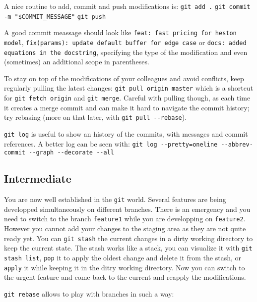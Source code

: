A nice routine to add, commit and push modifications is:\newline
\texttt{git add .}\newline
\texttt{git commit -m "\$COMMIT_MESSAGE"}\newline
\texttt{git push}

A good commit meassage should look like \texttt{feat: fast pricing for heston model}, \texttt{fix(params): update default buffer for edge case} or \texttt{docs: added equations in the docstring}, specifying the type of the modification and even (sometimes) an additional scope in parentheses.

To stay on top of the modifications of your colleagues and avoid conflicts, keep regularly pulling the latest changes:\newline
\texttt{git pull origin master}\newline
which is a shortcut for \texttt{git fetch origin} and \texttt{git merge}. Careful with pulling though, as each time it creates a merge commit and can make it hard to navigate the commit history; try rebasing (more on that later, with \texttt{git pull -{}-rebase}).

\texttt{git log} is useful to show an history of the commits, with messages and commit references. A better log can be seen with:\newline
\texttt{git log -{}-pretty=oneline -{}-abbrev-commit -{}-graph -{}-decorate -{}-all}

\subsection*{Intermediate}

You are now well established in the \texttt{git} world. Several features are being developped simultaneously on different branches. There is an emergency and you need to switch to the branch \texttt{feature1} while you are developping on \texttt{feature2}. However you cannot add your changes to the staging area as they are not quite ready yet. You can \texttt{git stash} the current changes in a dirty working directory to keep the current state. The stash works like a stack, you can visualize it with \texttt{git stash list}, \texttt{pop} it to apply the oldest change and delete it from the stash, or \texttt{apply} it while keeping it in the ditry working directory. Now you can switch to the urgent feature and come back to the current and reapply the modifications.

\texttt{git rebase} allows to play with branches in such a way:

